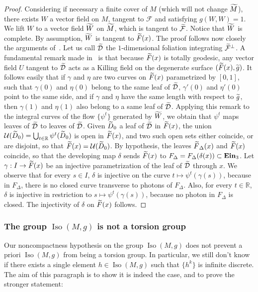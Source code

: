 \documentclass[11pt]{article}
\theoremstyle{definition}
\numberwithin{equation}{section}
\numberwithin{figure}{section}
\numberwithin{table}{section}
\DeclareMathOperator{\Iso}{Iso}
\DeclareMathOperator{\ein}{{\bf Ein}_3}
\newcommand{\cald}{\mathcal{D}}
\newcommand{\calf}{\mathcal{F}}
\newcommand{\tm}{\tilde{{M}}}
\newcommand{\tcalf}{\tilde{{\mathcal{F}}}}
\newcommand{\tFd}{\tilde{{F}}_{\Delta}}
\newcommand{\tF}{\tilde{{F}}}
\newcommand{\tD}{\tilde{{D}}}
\newcommand{\tcald}{\tilde{{\mathcal{D}}}}
\newcommand*\RR{\mathbb{R}}
\let\oldtilde\tilde
\renewcommand*\tilde[1]{\mathchoice{\widetilde{#1}}{\widetilde{#1}}{\widetilde{#1}}{\oldtilde{#1}}}
\begin{document}
\begin{proof}
Considering if necessary a finite cover of $M$ (which will not change $\tm$), there exists $W$ a vector field on $M$, tangent to $\calf$ and satisfying $g(W,W)=1$. We lift $W$ to a vector field $\tilde{W}$ on $\tm$, which is tangent to $\tcalf$. Notice that $\tilde{W}$ is complete. By assumption, $\tilde{W}$ is tangent to $\tF(x)$. The proof follows now closely the arguments of~\cite[Proposition~6.5]{zeghibflot}. Let us call $\tilde{\cald}$ the $1$-dimensional foliation integrating $\tcalf^{\perp}$. A fundamental remark made in~\cite[Proposition~2]{zeghibfoliation} is that because $\tF(x)$ is totally geodesic, any vector field $U$ tangent to $\tcald$ acts as a Killing field on the degenerate surface $(\tF(x),\tilde{g})$. It follows easily that if $\gamma$ and $\eta$ are two curves on $\tF(x)$ parametrized by $[0,1]$, such that $\gamma(0)$ and $\eta(0)$ belong to the same leaf of $\tcald$, $\gamma'(0)$ and $\eta'(0)$ point to the same side, and if $\gamma$ and $\eta$ have the same length with respect to $\tilde{g}$, then $\gamma(1)$ and $\eta(1)$ also belong to a same leaf of $\tcald$. Applying this remark to the integral curves of the flow $\{ \psi^t \}$ generated by $\tilde{W}$, we obtain that $\psi^t$ maps leaves of $\tilde{\cald}$ to leaves of $\tilde{\cald}$. Given $\tD_0$ a leaf of $\tcald$ in $\tF(x)$, the union ${\mathcal U}(\tD_0)=\bigcup_{t \in \RR} \psi^t(\tD_0)$ is open in $\tF(x)$, and two such open sets either coincide, or are disjoint, so that $\tF(x)={\mathcal U}(\tD_0)$. By hypothesis, the leaves $ \tFd(x)$ and $\tF(x)$ coincide, so that the developing map $\delta$ sends $ \tF(x)$ to $F_{\Delta}=F_{\Delta}(\delta(x)) \subset \ein$. Let $\gamma: I \to \tF(x)$ be an injective parametrization of the leaf of $\tcald$ through $x$. We observe that for every $s \in I$, $\delta$ is injective on the curve $t \mapsto \psi^t(\gamma(s))$, because in $F_{\Delta}$, there is no closed curve transverse to photons of $F_{\Delta}$. Also, for every $t \in \RR$, $\delta$ is injective in restriction to $s \mapsto \psi^t(\gamma(s))$, because no photon in $F_{\Delta}$ is closed. The injectivity of $\delta$ on $\tF(x)$ follows.
\end{proof}

\subsubsection{The group \texorpdfstring{$\Iso(M,g)$}{Iso(M,g)} is not a torsion group}\label{sec.notorsion}
Our noncompactness hypothesis on the group $\Iso(M,g)$ does not prevent a priori $\Iso(M,g)$ from being a torsion group. In particular, we still don't know if there exists a single element $h \in \Iso(M,g)$ such that $\{ h^k \}$ is infinite discrete. The aim of this paragraph is to show it is indeed the case, and to prove the stronger statement:
\end{document}
